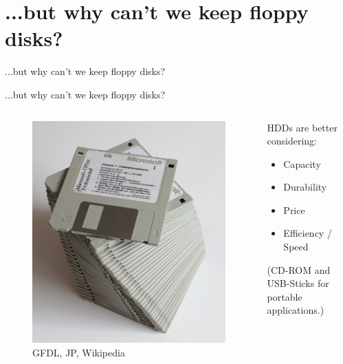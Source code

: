 \documentclass[12pt]{beamer}
\newlength{\wideitemsep}
\let\olditem\item
\renewcommand{\item}{\setlength{\itemsep}{\wideitemsep}\olditem}
\begin{document}
\section{...but why can't we keep floppy disks?}
\begin{frame}[standout]
	...but why can't we keep floppy disks?
\end{frame}
\begin{frame}[fragile]{...but why can't we keep floppy disks?}
	
	 \begin{columns}[c]
	 	\begin{column}[c]{.5\textwidth}
	 		\begin{figure}[p]
	 			\centering
	 			\includegraphics[width=\linewidth]{img/floppy_ms_office_crop.jpg}
	 			\caption{GFDL, JP, Wikipedia}
	 		\end{figure}
	 	\end{column}
	 	\begin{column}[c]{.5\textwidth}
	 		HDDs are better considering:
	 		\begin{itemize}
	 			\item Capacity
	 			\item Durability
	 			\item Price
	 			\item Efficiency / Speed
	 		\end{itemize}
	 		
		 	\hfill
		 	
		 	(CD-ROM and USB-Sticks for portable applications.)
	 	\end{column}
	 \end{columns}
\end{frame}
\end{document}
